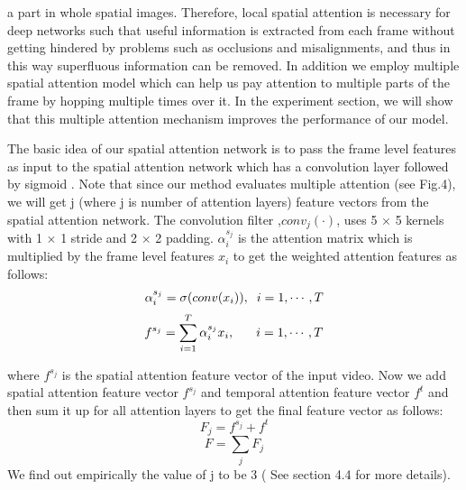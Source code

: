 \documentclass[sigconf, authordraft,review=false]{acmart}
\begin{document}
a part in whole spatial images.  Therefore, local spatial attention is necessary for deep networks such that useful information is extracted from each frame without getting hindered by problems such as occlusions and misalignments, and thus in this way superfluous information can be removed. In addition we employ multiple spatial attention model which can help us pay attention to multiple parts of the frame by hopping multiple times over it. In the
experiment section, we will show that this multiple attention mechanism improves the performance of our model.

The basic idea of our spatial attention network is to pass the frame level features as input to the spatial attention network which has a convolution layer followed by sigmoid . Note that since our method evaluates multiple attention (see Fig.4), we will get j (where j is number of attention layers) feature vectors from the spatial attention network. The convolution filter ,$conv_j(\cdot)$, uses
5 $\times$ 5 kernels with 1 $\times$  1 stride and 2 $\times$  2 padding. $\alpha_i^{s_j}$ is the attention matrix which is multiplied by the frame level features $x_i$ to get the weighted attention features as follows:
\begin{equation}
\alpha_i^{s_j}=\sigma(conv(x_i)), \hspace{0.2cm}i=1,\cdots,T
\end{equation}\begin{equation}
f^{s_j}=\sum_{i=1}^{T} \alpha^{s_j}_ix_i, \hspace{0.6cm}i=1,\cdots,T
\end{equation}
 
where $f^{s_j}$ is the spatial attention feature vector of the input video. Now we add spatial attention feature vector $f^{s_j}$ and temporal attention feature vector $f^t$ and then sum it up for all attention layers to get the final feature vector as follows:
\begin{equation}
F_j = f^{s_j} + f^t
\end{equation}\begin{equation}
F = \sum_j F_j
\end{equation}
We find out empirically the value of j to be 3 ( See section 4.4 for more details).
\end{document}
